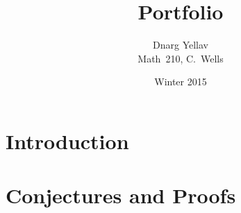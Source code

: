 \documentclass[12pt,pdftex]{article}
\title{Portfolio}
\date{Winter 2015}
\author{Dnarg Yellav\\Math~210, C.~Wells}
\begin{document}
\maketitle
\tableofcontents
\section{Introduction}
	
\section{Conjectures and Proofs}
	
	
	
	
	
	
	

\end{document}
